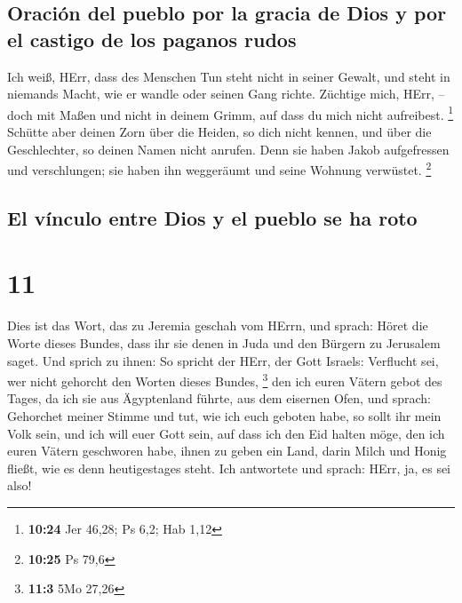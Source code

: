 \hypertarget{oraciuxf3n-del-pueblo-por-la-gracia-de-dios-y-por-el-castigo-de-los-paganos-rudos}{%
\subsection{Oración del pueblo por la gracia de Dios y por el castigo de
los paganos
rudos}\label{oraciuxf3n-del-pueblo-por-la-gracia-de-dios-y-por-el-castigo-de-los-paganos-rudos}}

 Ich weiß, HErr, dass des Menschen Tun steht nicht in
seiner Gewalt, und steht in niemands Macht, wie er wandle oder seinen
Gang richte.  Züchtige mich, HErr, -- doch mit Maßen und
nicht in deinem Grimm, auf dass du mich nicht aufreibest. \footnote{\textbf{10:24}
  Jer 46,28; Ps 6,2; Hab 1,12}  Schütte aber deinen Zorn
über die Heiden, so dich nicht kennen, und über die Geschlechter, so
deinen Namen nicht anrufen. Denn sie haben Jakob aufgefressen und
verschlungen; sie haben ihn weggeräumt und seine Wohnung verwüstet.
\footnote{\textbf{10:25} Ps 79,6}

\hypertarget{el-vuxednculo-entre-dios-y-el-pueblo-se-ha-roto}{%
\subsection{El vínculo entre Dios y el pueblo se ha
roto}\label{el-vuxednculo-entre-dios-y-el-pueblo-se-ha-roto}}

\hypertarget{section-10}{%
\section{11}\label{section-10}}

 Dies ist das Wort, das zu Jeremia geschah vom HErrn, und
sprach:  Höret die Worte dieses Bundes, dass ihr sie denen
in Juda und den Bürgern zu Jerusalem saget.  Und sprich zu
ihnen: So spricht der HErr, der Gott Israels: Verflucht sei, wer nicht
gehorcht den Worten dieses Bundes, \footnote{\textbf{11:3} 5Mo 27,26}
 den ich euren Vätern gebot des Tages, da ich sie aus
Ägyptenland führte, aus dem eisernen Ofen, und sprach: Gehorchet meiner
Stimme und tut, wie ich euch geboten habe, so sollt ihr mein Volk sein,
und ich will euer Gott sein,  auf dass ich den Eid halten
möge, den ich euren Vätern geschworen habe, ihnen zu geben ein Land,
darin Milch und Honig fließt, wie es denn heutigestages steht. Ich
antwortete und sprach: HErr, ja, es sei also!

